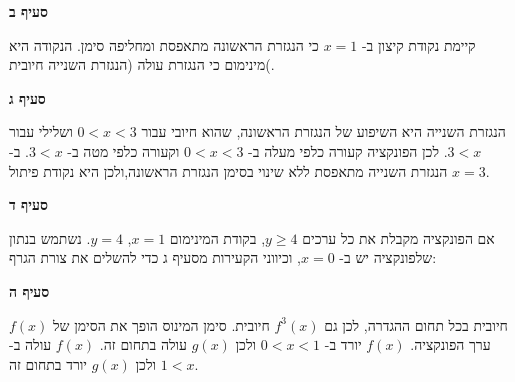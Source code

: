 \begin{center}
\end{center}

\np

\textbf{סעיף ב}

קיימת נקודת קיצון ב-%
$x=1$
כי הנגזרת הראשונה מתאפסת ומחליפה סימן. הנקודה היא מינימום כי הנגזרת עולה (הנגזרת השנייה חיובית(.


\textbf{סעיף ג}

הנגזרת השנייה היא השיפוע של הנגזרת הראשונה, שהוא חיובי עבור
$0<x<3$
ושלילי עבור
$3<x$.
לכן הפונקציה קעורה כלפי מעלה ב-%
$0<x<3$
וקעורה כלפי מטה ב-%
$3<x$.
ב-%
$x=3$
הנגזרת השנייה מתאפסת ללא שינוי בסימן הנגזרת הראשונה,ולכן היא נקודת פיתול.

\textbf{סעיף ד}

אם הפונקציה מקבלת את כל ערכים 
$y\geq 4$,
בקודת המינימום 
$x=1$,
$y=4$.
נשתמש בנתון שלפונקציה יש 
\asm{}
ב-%
$x=0$,
וכיווני הקעירות מסעיף ג כדי להשלים את צורת הגרף:

\begin{center}
\end{center}


\textbf{סעיף ה}

$f(x)$
חיובית בכל תחום ההגדרה, לכן גם
$f^3(x)$
חיובית. סימן המינוס הופך את הסימן של ערך הפונקציה. 
$f(x)$
יורד ב-%
$0<x<1$
ולכן 
$g(x)$
עולה בתחום זה.
$f(x)$
עולה ב-%
$1<x$
ולכן 
$g(x)$
יורד בתחום זה.

